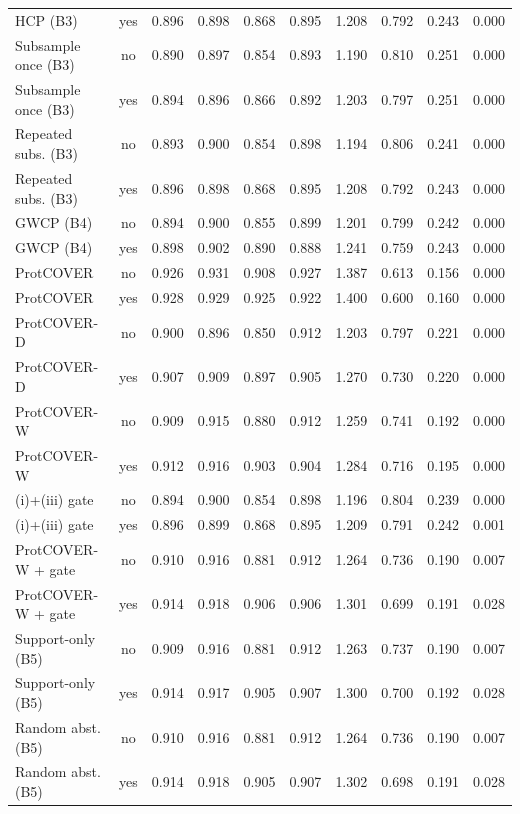 \begin{longtable}{lccccccccc}
HCP (B3) & yes & 0.896 & 0.898 & 0.868 & 0.895 & 1.208 & 0.792 & 0.243 & 0.000 \\
Subsample once (B3) & no & 0.890 & 0.897 & 0.854 & 0.893 & 1.190 & 0.810 & 0.251 & 0.000 \\
Subsample once (B3) & yes & 0.894 & 0.896 & 0.866 & 0.892 & 1.203 & 0.797 & 0.251 & 0.000 \\
Repeated subs. (B3) & no & 0.893 & 0.900 & 0.854 & 0.898 & 1.194 & 0.806 & 0.241 & 0.000 \\
Repeated subs. (B3) & yes & 0.896 & 0.898 & 0.868 & 0.895 & 1.208 & 0.792 & 0.243 & 0.000 \\
GWCP (B4) & no & 0.894 & 0.900 & 0.855 & 0.899 & 1.201 & 0.799 & 0.242 & 0.000 \\
GWCP (B4) & yes & 0.898 & 0.902 & 0.890 & 0.888 & 1.241 & 0.759 & 0.243 & 0.000 \\
ProtCOVER & no & 0.926 & 0.931 & 0.908 & 0.927 & 1.387 & 0.613 & 0.156 & 0.000 \\
ProtCOVER & yes & 0.928 & 0.929 & 0.925 & 0.922 & 1.400 & 0.600 & 0.160 & 0.000 \\
ProtCOVER-D & no & 0.900 & 0.896 & 0.850 & 0.912 & 1.203 & 0.797 & 0.221 & 0.000 \\
ProtCOVER-D & yes & 0.907 & 0.909 & 0.897 & 0.905 & 1.270 & 0.730 & 0.220 & 0.000 \\
ProtCOVER-W & no & 0.909 & 0.915 & 0.880 & 0.912 & 1.259 & 0.741 & 0.192 & 0.000 \\
ProtCOVER-W & yes & 0.912 & 0.916 & 0.903 & 0.904 & 1.284 & 0.716 & 0.195 & 0.000 \\
(i)+(iii) gate & no & 0.894 & 0.900 & 0.854 & 0.898 & 1.196 & 0.804 & 0.239 & 0.000 \\
(i)+(iii) gate & yes & 0.896 & 0.899 & 0.868 & 0.895 & 1.209 & 0.791 & 0.242 & 0.001 \\
ProtCOVER-W + gate & no & 0.910 & 0.916 & 0.881 & 0.912 & 1.264 & 0.736 & 0.190 & 0.007 \\
ProtCOVER-W + gate & yes & 0.914 & 0.918 & 0.906 & 0.906 & 1.301 & 0.699 & 0.191 & 0.028 \\
Support-only (B5) & no & 0.909 & 0.916 & 0.881 & 0.912 & 1.263 & 0.737 & 0.190 & 0.007 \\
Support-only (B5) & yes & 0.914 & 0.917 & 0.905 & 0.907 & 1.300 & 0.700 & 0.192 & 0.028 \\
Random abst. (B5) & no & 0.910 & 0.916 & 0.881 & 0.912 & 1.264 & 0.736 & 0.190 & 0.007 \\
Random abst. (B5) & yes & 0.914 & 0.918 & 0.905 & 0.907 & 1.302 & 0.698 & 0.191 & 0.028 \\

\end{longtable}
